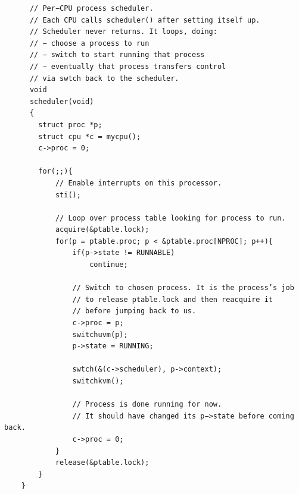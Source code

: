 \documentclass[titlepage,a4paper]{article}
\begin{document}
\begin{verbatim}
      // Per−CPU process scheduler.
      // Each CPU calls scheduler() after setting itself up.
      // Scheduler never returns. It loops, doing:
      // − choose a process to run
      // − switch to start running that process
      // − eventually that process transfers control
      // via swtch back to the scheduler.
      void
      scheduler(void)
      {
        struct proc *p;
        struct cpu *c = mycpu();
        c->proc = 0;
    
        for(;;){
            // Enable interrupts on this processor.
            sti();
        
            // Loop over process table looking for process to run.
            acquire(&ptable.lock);
            for(p = ptable.proc; p < &ptable.proc[NPROC]; p++){
                if(p->state != RUNNABLE)
                    continue;
                
                // Switch to chosen process. It is the process’s job
                // to release ptable.lock and then reacquire it
                // before jumping back to us.
                c->proc = p;
                switchuvm(p);
                p->state = RUNNING;
                
                swtch(&(c->scheduler), p->context);
                switchkvm();
                
                // Process is done running for now.
                // It should have changed its p−>state before coming back.
                c->proc = 0;
            }
            release(&ptable.lock);
        }
    }
\end{verbatim}



\end{document}

